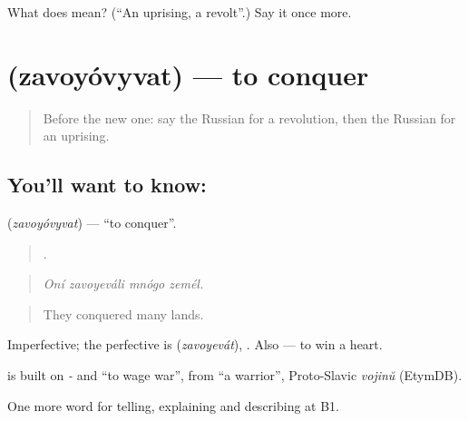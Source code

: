 \begin{tcolorbox}[breakable,colback=teal!4,colframe=teal!35!black,title={Before you move on}]
What does  mean? (\textquotedblleft{}An uprising, a revolt\textquotedblright{}.) Say it once more.
\end{tcolorbox}
\section[\texorpdfstring{\ru{завоёвывать} (zavoyóvyvat)}{завоёвывать (zavoyóvyvat)}]{ (zavoyóvyvat) — to conquer}

\label{lesson:RU-C325-zavoyovyvat}



\begin{quote}
Before the new one: say the Russian for a revolution, then the Russian for an uprising.
\end{quote}

\subsection*{You'll want to know: }
\textbf{} (\emph{zavoyóvyvat}) — \textquotedblleft{}to conquer\textquotedblright{}.

\begin{quote}
   .
\end{quote}

\begin{quote}
\emph{Oní zavoyeváli mnógo zemél.}
\end{quote}

\begin{quote}
They conquered many lands.
\end{quote}

Imperfective; the perfective is \emph{} (\emph{zavoyevát}), \emph{}. Also \emph{ } — to win a heart.

\begin{cousinweb}
\emph{} is built on \emph{-} and \emph{} \textquotedblleft{}to wage war\textquotedblright{}, from \emph{} \textquotedblleft{}a warrior\textquotedblright{}, Proto-Slavic \emph{vojinŭ} (EtymDB).
\end{cousinweb}

\begin{grammarlens}[title={What you've built}]
One more word for telling, explaining and describing at B1.
\end{grammarlens}

